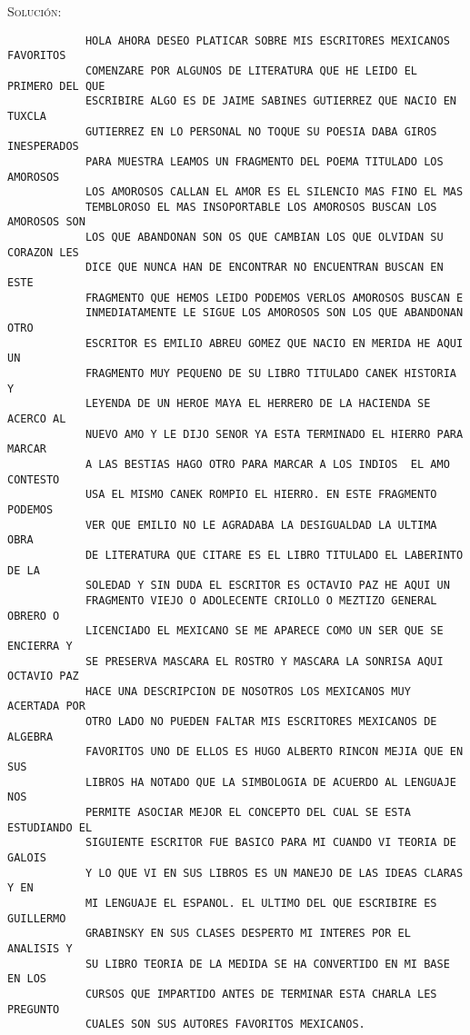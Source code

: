 \documentclass[letterpaper,10pt]{article}
\begin{document}
\begin{enumerate}
\begin{enumerate}
        \textsc{Solución:}
        \begin{verbatim}
            HOLA AHORA DESEO PLATICAR SOBRE MIS ESCRITORES MEXICANOS FAVORITOS 
            COMENZARE POR ALGUNOS DE LITERATURA QUE HE LEIDO EL PRIMERO DEL QUE 
            ESCRIBIRE ALGO ES DE JAIME SABINES GUTIERREZ QUE NACIO EN TUXCLA    
            GUTIERREZ EN LO PERSONAL NO TOQUE SU POESIA DABA GIROS INESPERADOS 
            PARA MUESTRA LEAMOS UN FRAGMENTO DEL POEMA TITULADO LOS AMOROSOS 
            LOS AMOROSOS CALLAN EL AMOR ES EL SILENCIO MAS FINO EL MAS 
            TEMBLOROSO EL MAS INSOPORTABLE LOS AMOROSOS BUSCAN LOS AMOROSOS SON 
            LOS QUE ABANDONAN SON OS QUE CAMBIAN LOS QUE OLVIDAN SU CORAZON LES 
            DICE QUE NUNCA HAN DE ENCONTRAR NO ENCUENTRAN BUSCAN EN ESTE 
            FRAGMENTO QUE HEMOS LEIDO PODEMOS VERLOS AMOROSOS BUSCAN E   
            INMEDIATAMENTE LE SIGUE LOS AMOROSOS SON LOS QUE ABANDONAN OTRO 
            ESCRITOR ES EMILIO ABREU GOMEZ QUE NACIO EN MERIDA HE AQUI UN     
            FRAGMENTO MUY PEQUENO DE SU LIBRO TITULADO CANEK HISTORIA Y 
            LEYENDA DE UN HEROE MAYA EL HERRERO DE LA HACIENDA SE ACERCO AL 
            NUEVO AMO Y LE DIJO SENOR YA ESTA TERMINADO EL HIERRO PARA MARCAR 
            A LAS BESTIAS HAGO OTRO PARA MARCAR A LOS INDIOS  EL AMO CONTESTO    
            USA EL MISMO CANEK ROMPIO EL HIERRO. EN ESTE FRAGMENTO PODEMOS  
            VER QUE EMILIO NO LE AGRADABA LA DESIGUALDAD LA ULTIMA OBRA 
            DE LITERATURA QUE CITARE ES EL LIBRO TITULADO EL LABERINTO DE LA 
            SOLEDAD Y SIN DUDA EL ESCRITOR ES OCTAVIO PAZ HE AQUI UN 
            FRAGMENTO VIEJO O ADOLECENTE CRIOLLO O MEZTIZO GENERAL OBRERO O     
            LICENCIADO EL MEXICANO SE ME APARECE COMO UN SER QUE SE ENCIERRA Y 
            SE PRESERVA MASCARA EL ROSTRO Y MASCARA LA SONRISA AQUI OCTAVIO PAZ 
            HACE UNA DESCRIPCION DE NOSOTROS LOS MEXICANOS MUY ACERTADA POR 
            OTRO LADO NO PUEDEN FALTAR MIS ESCRITORES MEXICANOS DE ALGEBRA 
            FAVORITOS UNO DE ELLOS ES HUGO ALBERTO RINCON MEJIA QUE EN SUS 
            LIBROS HA NOTADO QUE LA SIMBOLOGIA DE ACUERDO AL LENGUAJE NOS 
            PERMITE ASOCIAR MEJOR EL CONCEPTO DEL CUAL SE ESTA ESTUDIANDO EL 
            SIGUIENTE ESCRITOR FUE BASICO PARA MI CUANDO VI TEORIA DE GALOIS
            Y LO QUE VI EN SUS LIBROS ES UN MANEJO DE LAS IDEAS CLARAS Y EN 
            MI LENGUAJE EL ESPANOL. EL ULTIMO DEL QUE ESCRIBIRE ES GUILLERMO 
            GRABINSKY EN SUS CLASES DESPERTO MI INTERES POR EL ANALISIS Y
            SU LIBRO TEORIA DE LA MEDIDA SE HA CONVERTIDO EN MI BASE EN LOS  
            CURSOS QUE IMPARTIDO ANTES DE TERMINAR ESTA CHARLA LES PREGUNTO 
            CUALES SON SUS AUTORES FAVORITOS MEXICANOS.
        \end{verbatim}


\end{enumerate}
\end{enumerate}
\end{document}
